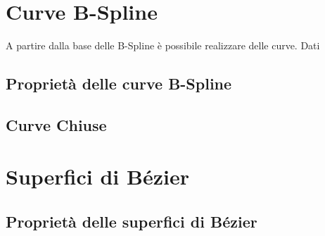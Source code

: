 \documentclass[a4paper, 10pt]{article}
\begin{document}
\section{Curve B-Spline}
A partire dalla base delle B-Spline è possibile realizzare delle curve. Dati 
\subsection{Proprietà delle curve B-Spline}
\subsection{Curve Chiuse}
\section{Superfici di Bézier}
\subsection{Proprietà delle superfici di Bézier}
\end{document}
